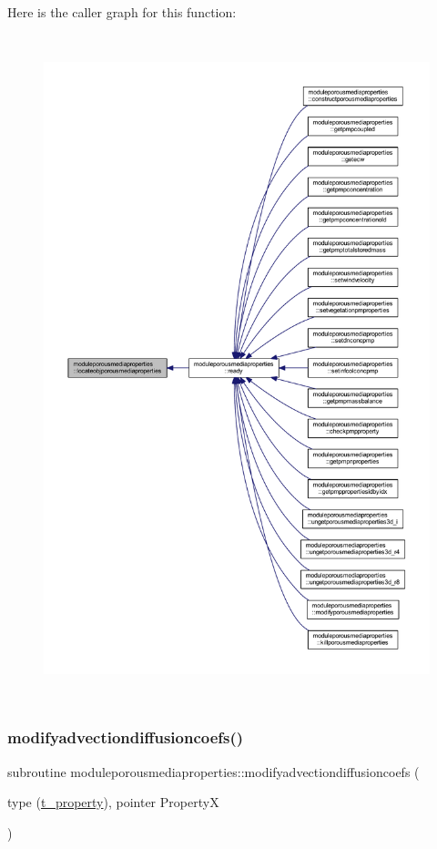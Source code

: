 Here is the caller graph for this function\+:\nopagebreak
\begin{figure}[H]
\begin{center}
\leavevmode
\includegraphics[height=550pt]{namespacemoduleporousmediaproperties_a69bcc7ae1a4b78b640c2d9f0d660587f_icgraph}
\end{center}
\end{figure}
\mbox{\label{namespacemoduleporousmediaproperties_aaeea83f4ec370391b45509fd7863a3bc}} 
\subsubsection{\texorpdfstring{modifyadvectiondiffusioncoefs()}{modifyadvectiondiffusioncoefs()}}
{\footnotesize\ttfamily subroutine moduleporousmediaproperties\+::modifyadvectiondiffusioncoefs (\begin{DoxyParamCaption}\item[{type (\mbox{\hyperlink{structmoduleporousmediaproperties_1_1t__property}{t\+\_\+property}}), pointer}]{PropertyX }\end{DoxyParamCaption})\hspace{0.3cm}{\ttfamily [private]}}

